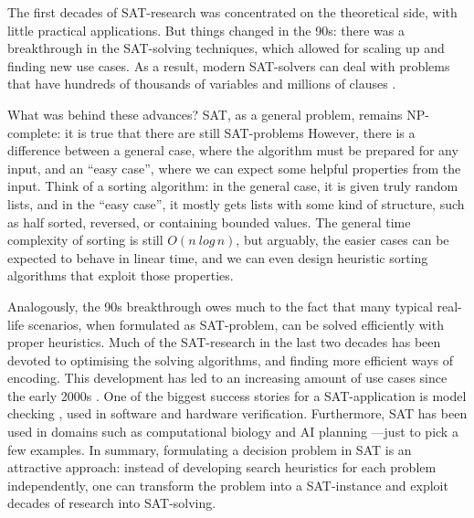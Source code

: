 The first decades of SAT-research was concentrated on the theoretical side, with little practical applications.
But things changed in the 90s: there was a breakthrough in the SAT-solving techniques, 
which allowed for scaling up and finding new use cases. As a result, modern SAT-solvers can deal with problems that have hundreds of thousands of variables and millions of clauses \cite{marques_silva2010}.

What was behind these advances? SAT, as a general problem, remains NP-complete: 
it is true that there are still SAT-problems 
However, there is a difference between a general case, where the algorithm must be prepared for any input, and an ``easy case'', where we can expect some helpful properties from the input.
Think of a sorting algorithm: in the general case, it is given truly random lists, and in the ``easy case'', it mostly gets lists with some kind of structure, such as half sorted, reversed, or containing bounded values. The general time complexity of sorting is still $O(n\ log\, n)$, but arguably, the easier cases can be expected to behave in linear time, and we can even design heuristic sorting algorithms that exploit those properties.

Analogously, the 90s breakthrough owes much to the fact that many typical real-life scenarios, 
when formulated as SAT-problem, can be solved efficiently with proper heuristics. 
Much of the SAT-research in the last two decades has been devoted to optimising the solving algorithms, and finding more efficient ways of encoding.%
This development has led to an increasing amount of use cases since the early 2000s \cite{claessen2009satpractice}.
One of the biggest success stories for a SAT-application is model checking \cite{sheeran1998modelchecking;biere1999modelchecking;bradley2011modelchecking}, used in software and hardware verification. Furthermore, SAT has been used in domains such as computational biology \cite{claessen2013compbioSAT} and AI planning ---just to pick a few examples.
In summary, formulating a decision problem in SAT is an attractive approach: instead of developing search heuristics for each problem independently, one can transform the problem into a SAT-instance and exploit decades of research into SAT-solving. 

